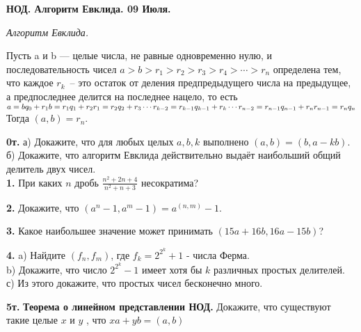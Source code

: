 \begin{center}
\Large

\textbf{НОД. Алгоритм Евклида. 09 Июля.}
\end{center}  

\large
\def\q#1.{{\smallskip\bf #1.}}

\bigskip
\large

\begin{definition}
\emph{Алгоритм Евклида.}

Пусть a и b — целые числа, не равные одновременно нулю, и последовательность чисел
$a > b > r_1 > r_2 > r_3 > r_4 > \cdots > r_n$
определена тем, что каждое $r_k$~-- это остаток от деления предпредыдущего числа на предыдущее, а предпоследнее делится на последнее нацело, то есть \\
$a = bq_0 + r_1 \\
b = r_1q_1 + r_2 \\
r_1 = r_2q_2 + r_3 \\
\cdots \\
r_{k-2} = r_{k-1} q_{k-1} + r_k \\
\cdots \\
r_{n-2} = r_{n-1}q_{n-1}+ r_n \\
r_{n-1} = r_n q_n$ \\
Тогда $(a,b)=r_n$.
\end{definition}



\q0т. а) Докажите, что для любых целых $a, b, k$ выполнено $(a, b) = (b, a-kb)$.\\
 б) Докажите, что алгоритм Евклида действительно выдаёт наибольший общий делитель двух чисел.\\





\q1. При каких $n$ дробь $\frac{n^2+2n+4}{n^2+n+3}$ несократима?

\q2. Докажите, что $(a^{n}-1,a^{m}-1)=a^{(n,m)}-1$.

\q3. Какое наибольшее значение может принимать $(15a+16b, 16a-15b)$?

\q4. a) Найдите $(f_{n},f_{m})$, где $f_{k}=2^{2^{k}}+1$ - числа Ферма. \\ 
b) Докажите, что число $2^{2^{k}}-1$ имеет хотя бы $k$ различных простых делителей. \\
с) Из этого докажите, что простых чисел бесконечно много.

\q5т. {\bf Теорема о линейном представлении НОД.} Докажите, что существуют такие целые $x$ и $y$ , что $xa+yb=(a,b)$

